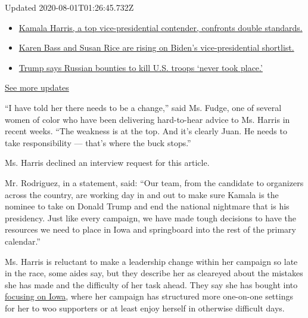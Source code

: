 Updated 2020-08-01T01:26:45.732Z

\begin{itemize}
\tightlist
\item
  \href{https://www.nytimes.com/2020/07/31/us/elections/biden-vs-trump.html?action=click\&pgtype=Article\&state=default\&region=MAIN_CONTENT_1\&context=storylines_live_updates\#link-29fdff45}{Kamala
  Harris, a top vice-presidential contender, confronts double
  standards.}
\item
  \href{https://www.nytimes.com/2020/07/31/us/elections/biden-vs-trump.html?action=click\&pgtype=Article\&state=default\&region=MAIN_CONTENT_1\&context=storylines_live_updates\#link-13ec3d9c}{Karen
  Bass and Susan Rice are rising on Biden's vice-presidential
  shortlist.}
\item
  \href{https://www.nytimes.com/2020/07/31/us/elections/biden-vs-trump.html?action=click\&pgtype=Article\&state=default\&region=MAIN_CONTENT_1\&context=storylines_live_updates\#link-49e9a016}{Trump
  says Russian bounties to kill U.S. troops `never took place.'}
\end{itemize}

\href{https://www.nytimes.com/2020/07/31/us/elections/biden-vs-trump.html?action=click\&pgtype=Article\&state=default\&region=MAIN_CONTENT_1\&context=storylines_live_updates}{See
more updates}

``I have told her there needs to be a change,'' said Ms. Fudge, one of
several women of color who have been delivering hard-to-hear advice to
Ms. Harris in recent weeks. ``The weakness is at the top. And it's
clearly Juan. He needs to take responsibility --- that's where the buck
stops.''

Ms. Harris declined an interview request for this article.

Mr. Rodriguez, in a statement, said: ``Our team, from the candidate to
organizers across the country, are working day in and out to make sure
Kamala is the nominee to take on Donald Trump and end the national
nightmare that is his presidency. Just like every campaign, we have made
tough decisions to have the resources we need to place in Iowa and
springboard into the rest of the primary calendar.''

Ms. Harris is reluctant to make a leadership change within her campaign
so late in the race, some aides say, but they describe her as cleareyed
about the mistakes she has made and the difficulty of her task ahead.
They say she has bought into
\href{https://www.nytimes.com/2019/10/06/us/politics/kamala-harris-campaign-iowa.html}{focusing
on Iowa}, where her campaign has structured more one-on-one settings for
her to woo supporters or at least enjoy herself in otherwise difficult
days.

